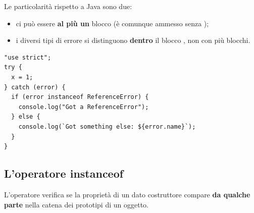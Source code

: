Le particolarità rispetto a Java sono due:

\begin{itemize}
  \item ci può essere \textbf{al più un} blocco  (è comunque
        ammesso  senza );
  \item i diversi tipi di errore si distinguono \textbf{dentro} il blocco
        , non con più blocchi.
\end{itemize}

\begin{lstlisting}[style=js, name=tipi-errore.js]
"use strict";
try {
  x = 1;
} catch (error) {
  if (error instanceof ReferenceError) {
    console.log("Got a ReferenceError");
  } else {
    console.log(`Got something else: ${error.name}`);
  }
}
\end{lstlisting}

\subsection{L'operatore instanceof}

L'operatore  verifica se la proprietà  di un
dato costruttore compare \textbf{da qualche parte} nella catena dei prototipi di
un oggetto.

